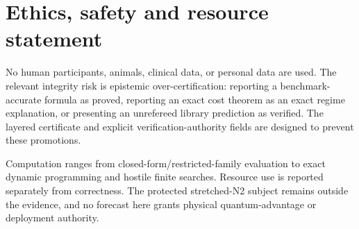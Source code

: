 \section{Ethics, safety and resource statement}

No human participants, animals, clinical data, or personal data are used. The relevant integrity risk is epistemic over-certification: reporting a benchmark-accurate formula as proved, reporting an exact cost theorem as an exact regime explanation, or presenting an unrefereed library prediction as verified. The layered certificate and explicit verification-authority fields are designed to prevent these promotions.

Computation ranges from closed-form/restricted-family evaluation to exact dynamic programming and hostile finite searches. Resource use is reported separately from correctness. The protected stretched-N2 subject remains outside the evidence, and no forecast here grants physical quantum-advantage or deployment authority.